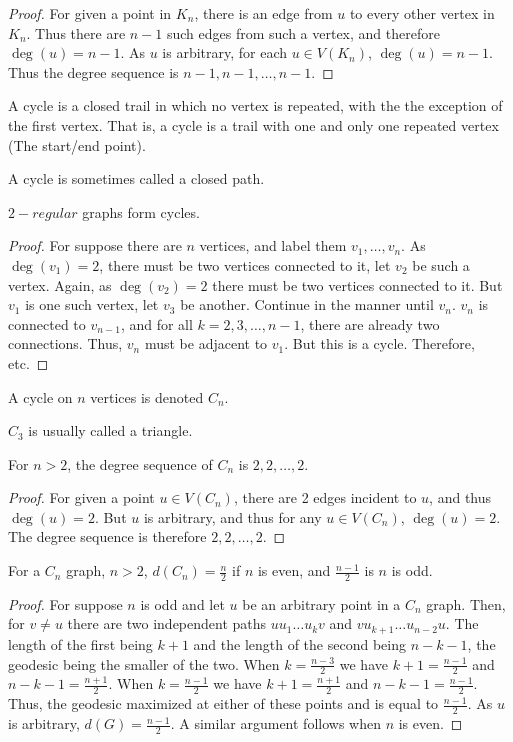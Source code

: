         \begin{proof}
        For given a point in $K_n$, there is an edge from $u$ to every other vertex in $K_n$. Thus there are $n-1$ such edges from such 
        a vertex, and therefore $\deg(u) = n-1$. As $u$ is arbitrary, for each $u\in V(K_n)$, $\deg(u) = n-1$. Thus the degree sequence is $n-1,n-1,\hdots, n-1$.
        \end{proof}
        \begin{definition}
        A cycle is a closed trail in which no vertex is repeated, with the the exception of the first vertex. That is, a cycle is a trail with one and only one repeated vertex (The start/end point).
        \end{definition}
        A cycle is sometimes called a closed path.
        \begin{theorem}
        $2-regular$ graphs form cycles.
        \end{theorem}
        \begin{proof}
        For suppose there are $n$ vertices, and label them $v_1,\hdots, v_n$. As $\deg(v_1)=2$, there must be two vertices connected to it, let $v_2$ be such a vertex. Again, as $\deg(v_2)=2$ there must be two vertices connected to it. But $v_1$ is one such vertex, let $v_3$ be another. Continue in the manner until $v_n$. $v_n$ is connected to $v_{n-1}$, and for all $k=2,3,\hdots, n-1$, there are already two connections. Thus, $v_n$ must be adjacent to $v_1$. But this is a cycle. Therefore, etc.
        \end{proof}
        \begin{definition}
        A cycle on $n$ vertices is denoted $C_n$.
        \end{definition}
        $C_3$ is usually called a triangle.
        \begin{theorem}
        For $n>2$, the degree sequence of $C_n$ is $2,2,\hdots, 2$.
        \end{theorem}
        \begin{proof}
        For given a point $u\in V(C_n)$, there are 2 edges incident to $u$, and thus $\deg(u) = 2$. But $u$ is arbitrary, and thus for any $u\in V(C_n)$, $\deg(u) = 2$. The degree sequence is therefore $2,2,\hdots, 2$.
        \end{proof}
        \begin{theorem}
        For a $C_n$ graph, $n>2$, $d(C_n) = \frac{n}{2}$ if $n$ is even, and $\frac{n-1}{2}$ is $n$ is odd.
        \end{theorem}
        \begin{proof}
        For suppose $n$ is odd and let $u$ be an arbitrary point in a $C_n$ graph. Then, for $v\ne u$ there are two independent paths $uu_1\hdots u_k v$ and $vu_{k+1}\hdots u_{n-2}u$. The length of the first being $k+1$ and the length of the second being $n-k-1$, the geodesic being the smaller of the two. When $k= \frac{n-3}{2}$ we have $k+1 = \frac{n-1}{2}$ and $n-k-1 = \frac{n+1}{2}$. When $k=\frac{n-1}{2}$ we have $k+1 = \frac{n+1}{2}$ and $n-k-1 = \frac{n-1}{2}$. Thus, the geodesic maximized at either of these points and is equal to $\frac{n-1}{2}$. As $u$ is arbitrary, $d(G) = \frac{n-1}{2}$. A similar argument follows when $n$ is even.
        \end{proof}
